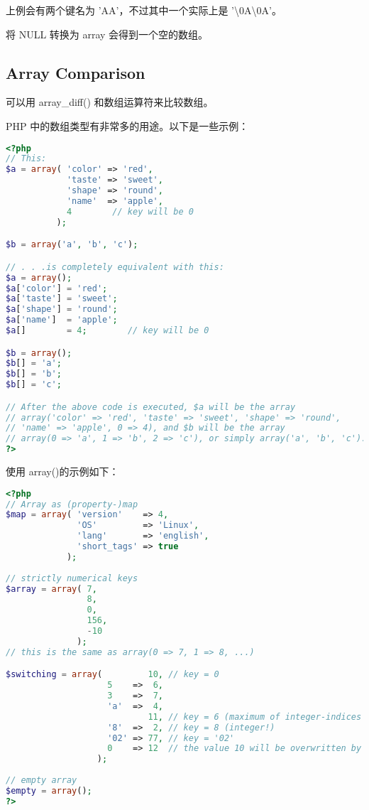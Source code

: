 上例会有两个键名为 'AA'，不过其中一个实际上是 '\textbackslash 0A\textbackslash 0A'。

将 NULL 转换为 array 会得到一个空的数组。


\subsection{Array Comparison}

可以用 array\_diff() 和数组运算符来比较数组。



PHP 中的数组类型有非常多的用途。以下是一些示例：




\begin{lstlisting}[language=PHP]
<?php
// This:
$a = array( 'color' => 'red',
            'taste' => 'sweet',
            'shape' => 'round',
            'name'  => 'apple',
            4        // key will be 0
          );

$b = array('a', 'b', 'c');

// . . .is completely equivalent with this:
$a = array();
$a['color'] = 'red';
$a['taste'] = 'sweet';
$a['shape'] = 'round';
$a['name']  = 'apple';
$a[]        = 4;        // key will be 0

$b = array();
$b[] = 'a';
$b[] = 'b';
$b[] = 'c';

// After the above code is executed, $a will be the array
// array('color' => 'red', 'taste' => 'sweet', 'shape' => 'round', 
// 'name' => 'apple', 0 => 4), and $b will be the array 
// array(0 => 'a', 1 => 'b', 2 => 'c'), or simply array('a', 'b', 'c').
?>
\end{lstlisting}


使用 array()的示例如下：

\begin{lstlisting}[language=PHP]
<?php
// Array as (property-)map
$map = array( 'version'    => 4,
              'OS'         => 'Linux',
              'lang'       => 'english',
              'short_tags' => true
            );
            
// strictly numerical keys
$array = array( 7,
                8,
                0,
                156,
                -10
              );
// this is the same as array(0 => 7, 1 => 8, ...)

$switching = array(         10, // key = 0
                    5    =>  6,
                    3    =>  7, 
                    'a'  =>  4,
                            11, // key = 6 (maximum of integer-indices was 5)
                    '8'  =>  2, // key = 8 (integer!)
                    '02' => 77, // key = '02'
                    0    => 12  // the value 10 will be overwritten by 12
                  );
                  
// empty array
$empty = array();         
?>

\end{lstlisting}



